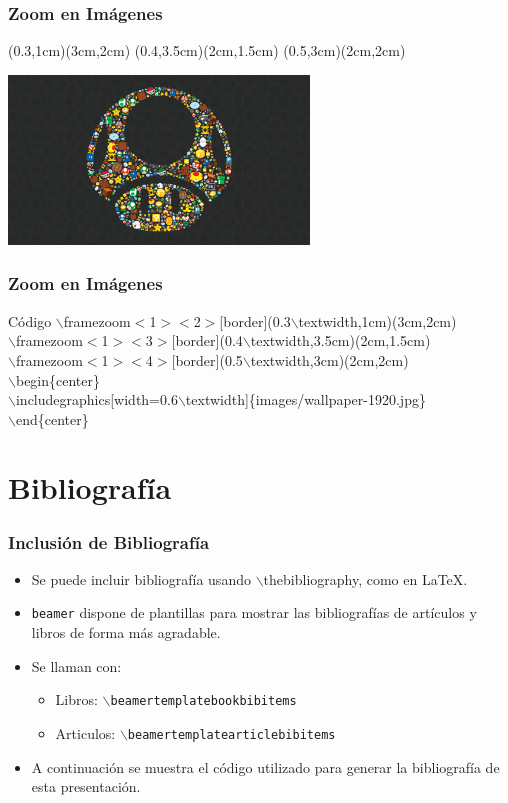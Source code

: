 \documentclass[aspectratio=43]{beamer}%
\begin{document}
\begin{frame}[fragile]
\frametitle{\textbf{Zoom en Imágenes}}
\justifying
{}(0.3\textwidth,1cm)(3cm,2cm)
(0.4\textwidth,3.5cm)(2cm,1.5cm)
(0.5\textwidth,3cm)(2cm,2cm)
\begin{center}
\includegraphics[width=0.6\textwidth]{images/wallpaper-1920.jpg} \end{center}
\end{frame}

\begin{frame}[fragile]
\frametitle{\textbf{Zoom en Imágenes}}
\justifying
 \begin{block}{Código}
$\backslash$framezoom$<$1$><$2$>$[border](0.3$\backslash$textwidth,1cm)(3cm,2cm) \\
$\backslash$framezoom$<$1$><$3$>$[border](0.4$\backslash$textwidth,3.5cm)(2cm,1.5cm)\\
$\backslash$framezoom$<$1$><$4$>$[border](0.5$\backslash$textwidth,3cm)(2cm,2cm) \\
$\backslash$begin\{center\}\\
$\backslash$includegraphics[width=0.6$\backslash$textwidth]\{images/wallpaper-1920.jpg\}\\
$\backslash$end\{center\}
\end{block}

\end{frame}


\section{Bibliografía}
\begin{frame}[fragile]
\frametitle{\textbf{Inclusión de Bibliografía}}
\justifying
 \begin{itemize}\justifying
  \item Se puede incluir bibliografía usando $\backslash$thebibliography, como en \LaTeX{}.
  \item \texttt{beamer} dispone de plantillas para mostrar las bibliografías de artículos y libros de forma más agradable.
  \item Se llaman con:
  \begin{itemize}\justifying
  \item Libros: \texttt{$\backslash$beamertemplatebookbibitems}
  \item Articulos: \texttt{$\backslash$beamertemplatearticlebibitems}
\end{itemize}
  \item A continuación se muestra el código utilizado para generar la bibliografía de esta presentación.
\end{itemize}
\end{frame}
\end{document}
